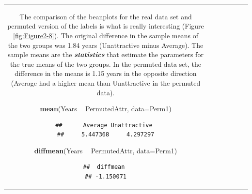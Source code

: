 \documentclass[]{book}
\newenvironment{Shaded}{\begin{snugshade}}{\end{snugshade}}
\newcommand{\KeywordTok}[1]{\textcolor[rgb]{0.13,0.29,0.53}{\textbf{#1}}}
\newcommand{\DataTypeTok}[1]{\textcolor[rgb]{0.13,0.29,0.53}{#1}}
\newcommand{\StringTok}[1]{\textcolor[rgb]{0.31,0.60,0.02}{#1}}
\newcommand{\OperatorTok}[1]{\textcolor[rgb]{0.81,0.36,0.00}{\textbf{#1}}}
\newcommand{\NormalTok}[1]{#1}
\theoremstyle{definition}
\theoremstyle{definition}
\theoremstyle{remark}
\begin{document}
\begin{longtable}[]{@{}ccccccc@{}}
\begin{minipage}[b]{0.10\columnwidth}
The comparison of the beanplots for the real data set and permuted
version of the labels is what is really interesting (Figure
\ref{fig:Figure2-8}). The original difference in the sample means of the
two groups was 1.84 years (Unattractive minus Average). The sample means
are the \textbf{\emph{statistics}} that estimate the parameters for the
true means of the two groups. In the permuted data set, the difference
in the means is 1.15 years in the opposite direction (Average had a
higher mean than Unattractive in the permuted data).

\begin{Shaded}
\begin{Highlighting}[]
\KeywordTok{mean}\NormalTok{(Years }\OperatorTok{~}\StringTok{ }\NormalTok{PermutedAttr, }\DataTypeTok{data=}\NormalTok{Perm1)}
\end{Highlighting}
\end{Shaded}

\begin{verbatim}
##      Average Unattractive 
##     5.447368     4.297297
\end{verbatim}

\begin{Shaded}
\begin{Highlighting}[]
\KeywordTok{diffmean}\NormalTok{(Years }\OperatorTok{~}\StringTok{ }\NormalTok{PermutedAttr, }\DataTypeTok{data=}\NormalTok{Perm1)}
\end{Highlighting}
\end{Shaded}

\begin{verbatim}
##  diffmean 
## -1.150071
\end{verbatim}





\end{minipage}
\end{longtable}
\end{document}
